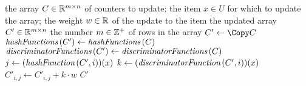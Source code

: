 \begin{algorithmic}[1]
  \In the array \( C \in \mathbb{R}^{m \times n} \) of counters to update; the item \( x \in U \) for which to update the array; the weight \( w \in \mathbb{R} \) of the update to the item
  \Out the updated array \( C' \in \mathbb{R}^{m \times n} \)
  \Constant the number \( m \in \mathbb{Z}^{+} \) of rows in the array
    \State \( C' \gets \Copy C \)
    \State \( \hashFunctions (C') \gets \hashFunctions (C) \)
    \State \( \discriminatorFunctions (C') \gets \discriminatorFunctions (C) \)
      \State \( j \gets (\hashFunction (C', i))(x) \)
      \State \( k \gets (\discriminatorFunction (C', i))(x) \)
      \State \( C'_{i, j} \gets C'_{i, j} + k \cdot w \)
    \EndFor
    \State \Return \( C' \)
  \EndFunction
\end{algorithmic}
